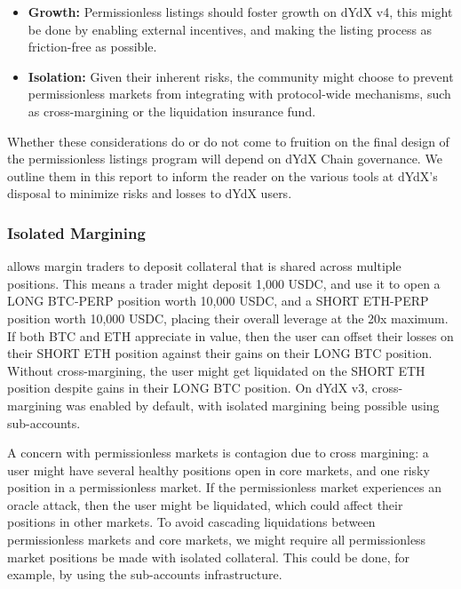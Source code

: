             \begin{itemize}
                \item \textbf{Growth:} Permissionless listings should foster growth on dYdX v4, this might be done by enabling external incentives, and making the listing process as friction-free as possible.
                \item \textbf{Isolation:} Given their inherent risks, the community might choose to prevent permissionless markets from integrating with protocol-wide mechanisms, such as cross-margining or the liquidation insurance fund.
            \end{itemize}
            
            Whether these considerations do or do not come to fruition on the final design of the permissionless listings program will depend on dYdX Chain governance. We outline them in this report to inform the reader on the various tools at dYdX's disposal to minimize risks and losses to dYdX users.
            
            \subsubsection{Isolated Margining}
                 allows margin traders to deposit collateral that is shared across multiple positions. This means a trader might deposit 1,000 USDC, and use it to open a LONG BTC-PERP position worth 10,000 USDC, and a SHORT ETH-PERP position worth 10,000 USDC, placing their overall leverage at the 20x maximum. If both BTC and ETH appreciate in value, then the user can offset their losses on their SHORT ETH position against their gains on their LONG BTC position. Without cross-margining, the user might get liquidated on the SHORT ETH position despite gains in their LONG BTC position. On dYdX v3, cross-margining was enabled by default, with isolated margining being possible using sub-accounts.
    
                A concern with permissionless markets is contagion due to cross margining: a user might have several healthy positions open in core markets, and one risky position in a permissionless market. If the permissionless market experiences an oracle attack, then the user might be liquidated, which could affect their positions in other markets. To avoid cascading liquidations between permissionless markets and core markets, we might require all permissionless market positions be made with isolated collateral. This could be done, for example, by using the sub-accounts infrastructure.

